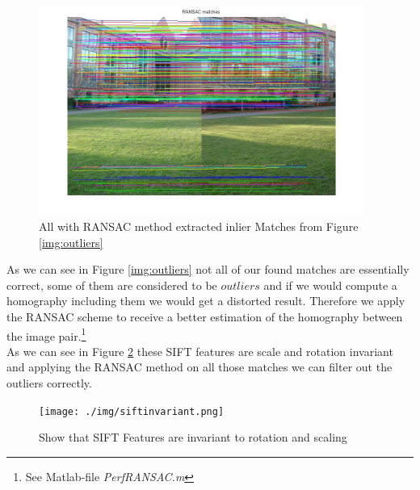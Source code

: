 \documentclass[subfigure,epsfig,fleqn,float,numbers=noenddot]{scrartcl}
\begin{document}
	\begin{figure}[H]
		\centering
		\includegraphics[width=0.95\textwidth]{./img/ransacMatches.jpg}
		\caption{All with RANSAC method extracted inlier Matches from Figure \ref{img:outliers}}
		\label{img:inliers}
	\end{figure}
As we can see in Figure \ref{img:outliers} not all of our found matches are essentially correct, some of them are considered to be $outliers$ and if we would compute a homography including them we would get a distorted result. Therefore we apply the RANSAC scheme to receive a better estimation of the homography between the image pair.\footnote{See Matlab-file \emph{PerfRANSAC.m} } \\
As we can see in Figure \ref{img:invariant} these SIFT features are scale and rotation invariant and applying the RANSAC method on all those matches we can filter out the outliers correctly.
	\begin{figure}[H]
		\centering
		\texttt{[image: ./img/siftinvariant.png]}
		\caption{Show that SIFT Features are invariant to rotation and scaling}
		\label{img:invariant}
	\end{figure}
	
\end{document}

